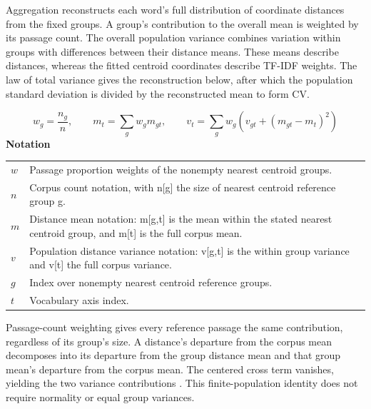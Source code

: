 \documentclass[10pt,letterpaper]{article}
\newcommand{\notlabel}{\noindent\textbf{Notation}\par\nobreak\vspace{4pt}}
\begin{document}
Aggregation reconstructs each word's full distribution of coordinate distances from the fixed groups. A group's contribution to the overall mean is weighted by its passage count. The overall population variance combines variation within groups with differences between their distance means. These means describe distances, whereas the fitted centroid coordinates describe TF-IDF weights. The law of total variance gives the reconstruction below, after which the population standard deviation is divided by the reconstructed mean to form CV.\par

\par\noindent\begin{minipage}{\linewidth}
\begin{equation}\label{eq:pooleddistance}
w_g=\frac{n_g}{n},\qquad m_t=\sum_g w_gm_{gt},\qquad v_t=\sum_gw_g\left(v_{gt}+(m_{gt}-m_t)^2\right)
\end{equation}
\notlabel
{\fontsize{8.5}{10.5}\selectfont\setlength{\tabcolsep}{0pt}\renewcommand{\arraystretch}{1.12}
\begin{tabularx}{\linewidth}{@{}p{.14\linewidth}X@{}}
$w$ & Passage proportion weights of the nonempty nearest centroid groups.\\
$n$ & Corpus count notation, with n[g] the size of nearest centroid reference group g.\\
$m$ & Distance mean notation: m[g,t] is the mean within the stated nearest centroid group, and m[t] is the full corpus mean.\\
$v$ & Population distance variance notation: v[g,t] is the within group variance and v[t] the full corpus variance.\\
$g$ & Index over nonempty nearest centroid reference groups.\\
$t$ & Vocabulary axis index.\\
\end{tabularx}}
\par\vspace{2pt}
\end{minipage}\par
Passage-count weighting gives every reference passage the same contribution, regardless of its group's size. A distance's departure from the corpus mean decomposes into its departure from the group distance mean and that group mean's departure from the corpus mean. The centered cross term vanishes, yielding the two variance contributions \cite{rudminpool}. This finite-population identity does not require normality or equal group variances.\par
\end{document}
